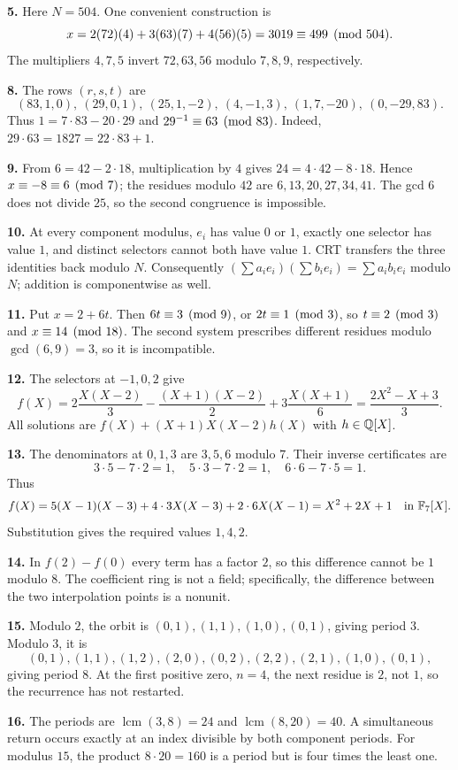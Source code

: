 \textbf{5.} Here $N=504$. One convenient construction is
\[
x=2(72)(4)+3(63)(7)+4(56)(5)=3019\equiv499\pmod{504}.
\]
The multipliers $4,7,5$ invert $72,63,56$ modulo $7,8,9$, respectively.

\textbf{8.} The rows $(r,s,t)$ are
\[
 (83,1,0),\ (29,0,1),\ (25,1,-2),\ (4,-1,3),\
 (1,7,-20),\ (0,-29,83).
\]
Thus $1=7\cdot83-20\cdot29$ and $29^{-1}\equiv63\pmod{83}$.
Indeed, $29\cdot63=1827=22\cdot83+1$.

\textbf{9.} From $6=42-2\cdot18$, multiplication by $4$ gives
$24=4\cdot42-8\cdot18$. Hence $x\equiv-8\equiv6\pmod7$;
the residues modulo $42$ are $6,13,20,27,34,41$.
The gcd $6$ does not divide $25$, so the second congruence is impossible.

\textbf{10.} At every component modulus, $e_i$ has value $0$ or $1$,
exactly one selector has value $1$, and distinct selectors cannot both
have value $1$. CRT transfers the three identities back modulo $N$.
Consequently
$(\sum a_i e_i)(\sum b_i e_i)=\sum a_i b_i e_i$ modulo $N$;
addition is componentwise as well.

\textbf{11.} Put $x=2+6t$. Then $6t\equiv3\pmod9$, or
$2t\equiv1\pmod3$, so $t\equiv2\pmod3$ and
$x\equiv14\pmod{18}$. The second system prescribes different residues
modulo $\gcd(6,9)=3$, so it is incompatible.

\textbf{12.} The selectors at $-1,0,2$ give
\[
 f(X)=2\frac{X(X-2)}3-\frac{(X+1)(X-2)}2
       +3\frac{X(X+1)}6
     =\frac{2X^2-X+3}{3}.
\]
All solutions are $f(X)+(X+1)X(X-2)h(X)$ with $h\in\mathbb Q[X]$.

\textbf{13.} The denominators at $0,1,3$ are $3,5,6$ modulo $7$.
Their inverse certificates are
\[
 3\cdot5-7\cdot2=1,\quad 5\cdot3-7\cdot2=1,\quad
 6\cdot6-7\cdot5=1.
\]
Thus
\[
 f(X)=5(X-1)(X-3)+4\cdot3X(X-3)+2\cdot6X(X-1)
     =X^2+2X+1\quad\text{in }\mathbb F_7[X].
\]
Substitution gives the required values $1,4,2$.

\textbf{14.} In $f(2)-f(0)$ every term has a factor $2$, so this
difference cannot be $1$ modulo $8$. The coefficient ring is not a
field; specifically, the difference between the two interpolation
points is a nonunit.

\textbf{15.} Modulo $2$, the orbit is
$(0,1),(1,1),(1,0),(0,1)$, giving period $3$.
Modulo $3$, it is
\[
 (0,1),(1,1),(1,2),(2,0),(0,2),(2,2),(2,1),(1,0),(0,1),
\]
giving period $8$. At the first positive zero, $n=4$, the next residue
is $2$, not $1$, so the recurrence has not restarted.

\textbf{16.} The periods are $\operatorname{lcm}(3,8)=24$ and
$\operatorname{lcm}(8,20)=40$. A simultaneous return occurs exactly at
an index divisible by both component periods. For modulus $15$,
the product $8\cdot20=160$ is a period but is four times the least one.


